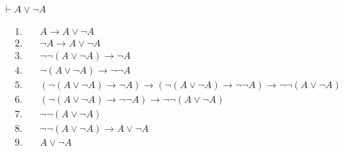 \begin{exercise}[4.a]
    \(\vdash A \lor \neg A\)

    \begin{align*}
        1.\quad & A \to A \lor \neg A \tag{aкс. 6}                                                                                      \\
        2.\quad & \neg A \to A \lor \neg A \tag{aкс. 7}                                                                                 \\
        3.\quad & \neg \neg (A \lor \neg A) \to \neg A \tag{закон контрапозиции}                                                        \\
        4.\quad & \neg (A \lor \neg A) \to \neg \neg A \tag{закон контрапозиции}                                                        \\
        5.\quad & (\neg (A\lor \neg A) \to \neg A) \to (\neg (A \lor \neg A) \to \neg \neg A) \to \neg \neg (A\lor \neg A) \tag{акс. 9} \\
        6.\quad & (\neg (A \lor \neg A) \to \neg \neg A) \to \neg \neg (A\lor \neg A) \tag{M.P. 4,6}                                    \\
        7.\quad & \neg \neg (A\lor \neg A) \tag{M.P. 5,7}                                                                               \\
        8.\quad & \neg \neg (A \lor \neg A) \to A \lor \neg A \tag{акс. 10}                                                             \\
        9.\quad & A \lor \neg A \tag{M.P. 8,9}                                                                                          \\
    \end{align*}
\end{exercise}

